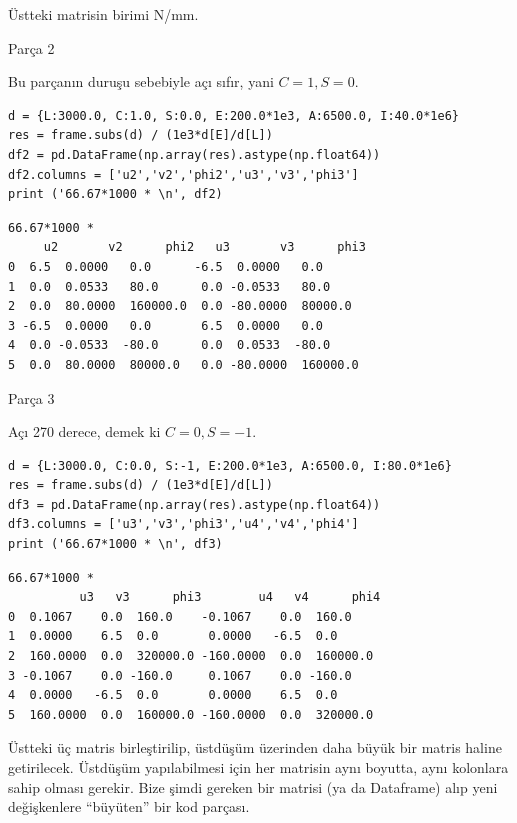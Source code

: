 \documentclass[12pt,fleqn]{article}\usepackage{../../common}
\begin{document}
Üstteki matrisin birimi N/mm. 

Parça 2

Bu parçanın duruşu sebebiyle açı sıfır, yani $C=1,S=0$.

\begin{verbatim}
d = {L:3000.0, C:1.0, S:0.0, E:200.0*1e3, A:6500.0, I:40.0*1e6}
res = frame.subs(d) / (1e3*d[E]/d[L])
df2 = pd.DataFrame(np.array(res).astype(np.float64))
df2.columns = ['u2','v2','phi2','u3','v3','phi3']
print ('66.67*1000 * \n', df2)
\end{verbatim}

\begin{verbatim}
66.67*1000 * 
     u2       v2      phi2   u3       v3      phi3
0  6.5  0.0000   0.0      -6.5  0.0000   0.0     
1  0.0  0.0533   80.0      0.0 -0.0533   80.0    
2  0.0  80.0000  160000.0  0.0 -80.0000  80000.0 
3 -6.5  0.0000   0.0       6.5  0.0000   0.0     
4  0.0 -0.0533  -80.0      0.0  0.0533  -80.0    
5  0.0  80.0000  80000.0   0.0 -80.0000  160000.0
\end{verbatim}

Parça 3

Açı 270 derece, demek ki $C=0,S=-1$.

\begin{verbatim}
d = {L:3000.0, C:0.0, S:-1, E:200.0*1e3, A:6500.0, I:80.0*1e6}
res = frame.subs(d) / (1e3*d[E]/d[L])
df3 = pd.DataFrame(np.array(res).astype(np.float64))
df3.columns = ['u3','v3','phi3','u4','v4','phi4']
print ('66.67*1000 * \n', df3)
\end{verbatim}

\begin{verbatim}
66.67*1000 * 
          u3   v3      phi3        u4   v4      phi4
0  0.1067    0.0  160.0    -0.1067    0.0  160.0   
1  0.0000    6.5  0.0       0.0000   -6.5  0.0     
2  160.0000  0.0  320000.0 -160.0000  0.0  160000.0
3 -0.1067    0.0 -160.0     0.1067    0.0 -160.0   
4  0.0000   -6.5  0.0       0.0000    6.5  0.0     
5  160.0000  0.0  160000.0 -160.0000  0.0  320000.0
\end{verbatim}

Üstteki üç matris birleştirilip, üstdüşüm üzerinden daha büyük bir matris haline
getirilecek. Üstdüşüm yapılabilmesi için her matrisin aynı boyutta, aynı
kolonlara sahip olması gerekir. Bize şimdi gereken bir matrisi (ya da Dataframe)
alıp yeni değişkenlere ``büyüten'' bir kod parçası.
\end{document}
